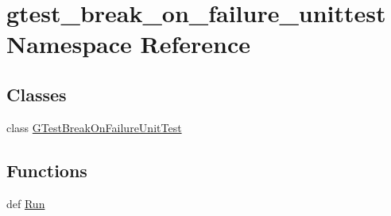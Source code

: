 \hypertarget{namespacegtest__break__on__failure__unittest}{\section{gtest\-\_\-break\-\_\-on\-\_\-failure\-\_\-unittest Namespace Reference}
\label{namespacegtest__break__on__failure__unittest}
}
\subsection*{Classes}
\begin{DoxyCompactItemize}
\item 
class \hyperlink{classgtest__break__on__failure__unittest_1_1_g_test_break_on_failure_unit_test}{G\-Test\-Break\-On\-Failure\-Unit\-Test}
\end{DoxyCompactItemize}
\subsection*{Functions}
\begin{DoxyCompactItemize}
\item 
def \hyperlink{namespacegtest__break__on__failure__unittest_ae784214748d2010e70d5519ce618af5f}{Run}
\end{DoxyCompactItemize}
